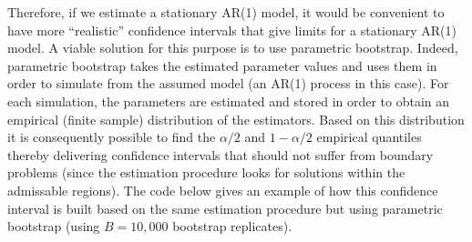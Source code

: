 \documentclass[]{book}
\theoremstyle{definition}
\theoremstyle{definition}
\theoremstyle{definition}
\theoremstyle{remark}
\begin{document}
Therefore, if we estimate a stationary AR(1) model, it would be
convenient to have more ``realistic'' confidence intervals that give
limits for a stationary AR(1) model. A viable solution for this purpose
is to use parametric bootstrap. Indeed, parametric bootstrap takes the
estimated parameter values and uses them in order to simulate from the
assumed model (an AR(1) process in this case). For each simulation, the
parameters are estimated and stored in order to obtain an empirical
(finite sample) distribution of the estimators. Based on this
distribution it is consequently possible to find the \(\alpha/2\) and
\(1-\alpha/2\) empirical quantiles thereby delivering confidence
intervals that should not suffer from boundary problems (since the
estimation procedure looks for solutions within the admissable regions).
The code below gives an example of how this confidence interval is built
based on the same estimation procedure but using parametric bootstrap
(using \(B = 10,000\) bootstrap replicates).
\end{document}
